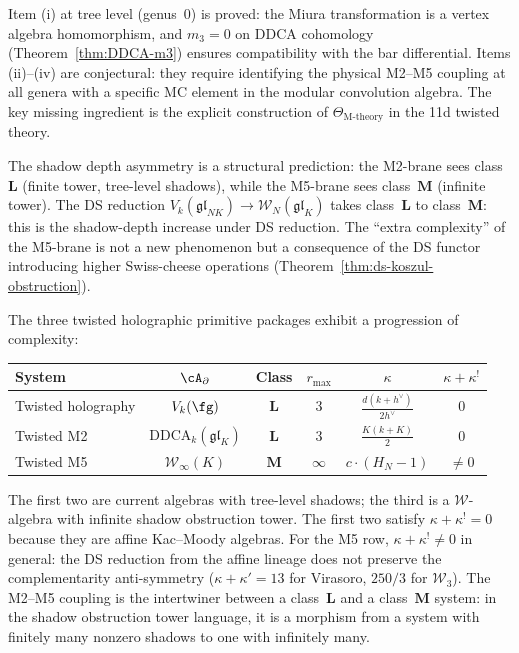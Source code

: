 \begin{remark}
\label{rem:M2-M5-proved-vs-conjectural}
Item (i) at tree level (genus~$0$) is proved: the Miura
transformation is a vertex algebra homomorphism, and
$m_3 = 0$ on DDCA cohomology
(Theorem~\ref{thm:DDCA-m3}) ensures compatibility with
the bar differential. Items (ii)--(iv) are conjectural:
they require identifying the physical M2--M5 coupling at
all genera with a specific MC element in the modular
convolution algebra. The key missing ingredient is the
explicit construction of $\Theta_{\mathrm{M\text{-}theory}}$
in the 11d twisted theory.

The shadow depth asymmetry is a structural prediction:
the M2-brane sees class~$\mathbf{L}$ (finite tower, tree-level
shadows), while the M5-brane sees class~$\mathbf{M}$ (infinite
tower). The DS reduction $V_k(\mathfrak{gl}_{NK}) \to
\mathcal{W}_N(\mathfrak{gl}_K)$ takes class~$\mathbf{L}$ to
class~$\mathbf{M}$: this is the shadow-depth increase under DS
reduction. The ``extra complexity'' of the M5-brane is not
a new phenomenon but a consequence of the DS functor
introducing higher Swiss-cheese operations
(Theorem~\ref{thm:ds-koszul-obstruction}).
\end{remark}

\begin{remark}
\label{rem:three-package-comparison}
The three twisted holographic primitive packages exhibit a
progression of complexity:
\begin{center}
\renewcommand{\arraystretch}{1.2}
\small
\begin{tabular}{lccccc}
\textbf{System} & $\cA_\partial$ & \textbf{Class} & $r_{\max}$
 & $\kappa$ & $\kappa + \kappa^!$ \\
\hline
Twisted holography & $V_k(\fg)$ & $\mathbf{L}$ & $3$
 & $\frac{d(k + h^\vee)}{2h^\vee}$ & $0$ \\
Twisted M2 & $\mathrm{DDCA}_k(\mathfrak{gl}_K)$ & $\mathbf{L}$ & $3$
 & $\frac{K(k + K)}{2}$ & $0$ \\
Twisted M5 & $\mathcal{W}_\infty(K)$ & $\mathbf{M}$ & $\infty$
 & $c \cdot (H_N {-} 1)$ & $\ne 0$
\end{tabular}
\end{center}
The first two are current algebras with tree-level shadows;
the third is a $\mathcal{W}$-algebra with infinite shadow obstruction tower.
The first two satisfy $\kappa + \kappa^! = 0$ because they are
affine Kac--Moody algebras. For the M5 row,
$\kappa + \kappa^! \ne 0$ in general: the DS reduction from the
affine lineage does not preserve the complementarity anti-symmetry
\textup{(}$\kappa + \kappa' = 13$ for Virasoro,
$250/3$ for $\mathcal{W}_3$\textup{)}.
The M2--M5 coupling is the intertwiner
between a class~$\mathbf{L}$ and a class~$\mathbf{M}$ system:
in the shadow obstruction tower language, it is a morphism from a system with
finitely many nonzero shadows to one with infinitely many.
\end{remark}


